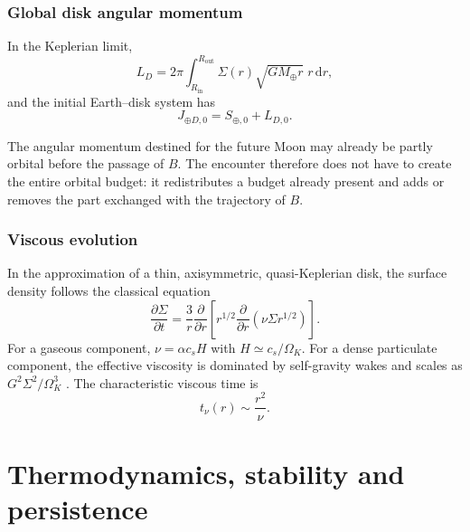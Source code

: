 \documentclass[11pt,a4paper,openany]{report}
\newcommand{\Mt}{M_{\oplus}}
\newcommand{\dd}{\mathrm{d}}
\begin{document}
\subsection{Global disk angular momentum}

In the Keplerian limit,
\begin{equation}
L_D=2\pi\int_{R_{\mathrm{in}}}^{R_{\mathrm{out}}}\Sigma(r)\sqrt{G\Mt r}\;r\,\dd r,
\label{eq:LD}
\end{equation}
and the initial Earth--disk system has
\begin{equation}
J_{\oplus D,0}=S_{\oplus,0}+L_{D,0}.
\label{eq:J0}
\end{equation}

\begin{ideephys}
The angular momentum destined for the future Moon may already be partly orbital before the passage
of $B$. The encounter therefore does not have to create the entire orbital budget: it redistributes
a budget already present and adds or removes the part exchanged with the trajectory of $B$.
\end{ideephys}

\subsection{Viscous evolution}

In the approximation of a thin, axisymmetric, quasi-Keplerian disk, the surface density follows the
classical equation \cite{Pringle1981}
\begin{equation}
\frac{\partial\Sigma}{\partial t}=\frac{3}{r}\frac{\partial}{\partial r}
\left[r^{1/2}\frac{\partial}{\partial r}\left(\nu\Sigma r^{1/2}\right)\right].
\label{eq:visc}
\end{equation}
For a gaseous component, $\nu=\alpha c_sH$ with $H\simeq c_s/\Omega_K$. For a dense particulate
component, the effective viscosity is dominated by self-gravity wakes and scales as
$G^2\Sigma^2/\Omega_K^3$ \cite{Daisaka2001}. The characteristic viscous time is
\begin{equation}
t_\nu(r)\sim\frac{r^2}{\nu}.
\label{eq:tnu}
\end{equation}

\chapter{Thermodynamics, stability and persistence}
\label{ch:thermo}
\end{document}
